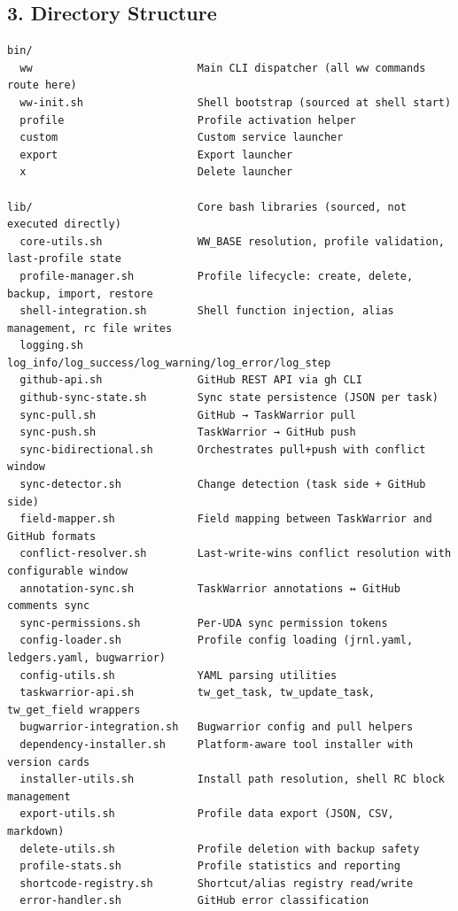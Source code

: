 \documentclass[11pt, a4paper, DIV=14]{scrartcl}
\begin{document}
\subsection{3. Directory Structure}\label{directory-structure}

\begin{verbatim}
bin/
  ww                          Main CLI dispatcher (all ww commands route here)
  ww-init.sh                  Shell bootstrap (sourced at shell start)
  profile                     Profile activation helper
  custom                      Custom service launcher
  export                      Export launcher
  x                           Delete launcher

lib/                          Core bash libraries (sourced, not executed directly)
  core-utils.sh               WW_BASE resolution, profile validation, last-profile state
  profile-manager.sh          Profile lifecycle: create, delete, backup, import, restore
  shell-integration.sh        Shell function injection, alias management, rc file writes
  logging.sh                  log_info/log_success/log_warning/log_error/log_step
  github-api.sh               GitHub REST API via gh CLI
  github-sync-state.sh        Sync state persistence (JSON per task)
  sync-pull.sh                GitHub → TaskWarrior pull
  sync-push.sh                TaskWarrior → GitHub push
  sync-bidirectional.sh       Orchestrates pull+push with conflict window
  sync-detector.sh            Change detection (task side + GitHub side)
  field-mapper.sh             Field mapping between TaskWarrior and GitHub formats
  conflict-resolver.sh        Last-write-wins conflict resolution with configurable window
  annotation-sync.sh          TaskWarrior annotations ↔ GitHub comments sync
  sync-permissions.sh         Per-UDA sync permission tokens
  config-loader.sh            Profile config loading (jrnl.yaml, ledgers.yaml, bugwarrior)
  config-utils.sh             YAML parsing utilities
  taskwarrior-api.sh          tw_get_task, tw_update_task, tw_get_field wrappers
  bugwarrior-integration.sh   Bugwarrior config and pull helpers
  dependency-installer.sh     Platform-aware tool installer with version cards
  installer-utils.sh          Install path resolution, shell RC block management
  export-utils.sh             Profile data export (JSON, CSV, markdown)
  delete-utils.sh             Profile deletion with backup safety
  profile-stats.sh            Profile statistics and reporting
  shortcode-registry.sh       Shortcut/alias registry read/write
  error-handler.sh            GitHub error classification


\end{verbatim}
\end{document}
